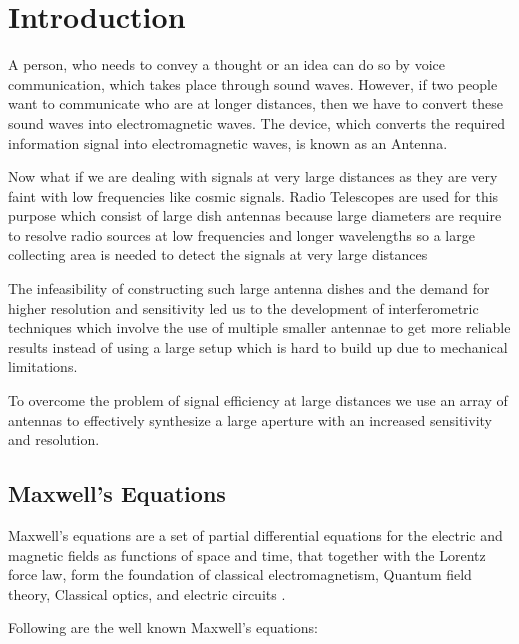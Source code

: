 \chapter{Introduction}

A person, who needs to convey a thought or an idea can do so by voice communication, which takes place through sound waves. However, if two people want to communicate who are at longer distances, then we have to convert these sound waves into electromagnetic waves. The device, which converts the required information signal into electromagnetic waves, is known as an Antenna.

Now what if we are dealing with signals at very large distances as they are very faint with low frequencies like cosmic signals. Radio Telescopes are used for this purpose which consist of large dish antennas because large diameters are require to resolve radio sources at low frequencies and longer wavelengths so a large collecting area is needed to detect the signals at very large distances%

The infeasibility of constructing such large antenna dishes and the demand for higher resolution and sensitivity led us to the development of interferometric techniques which involve the use of multiple smaller antennae to get more reliable results instead of using a large setup which is hard to build up due to mechanical limitations.

To overcome the problem of signal efficiency at large distances we use an array of antennas to effectively synthesize a large aperture with an increased sensitivity and resolution.
 

\section{Maxwell's Equations}

Maxwell’s equations are a set of partial differential equations for the electric and magnetic fields as functions of space and time, that together with the Lorentz force law, form the foundation of classical electromagnetism, Quantum field theory, Classical optics, and electric circuits \cite{griffiths1962introduction}.

Following are the well known Maxwell's equations:

